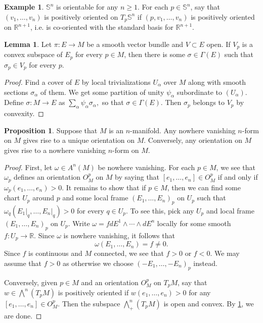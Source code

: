 \documentclass[10pt,letterpaper,cm]{nupset}
\theoremstyle{definition}
\newtheorem{exmp}[definition]{Example}
\theoremstyle{theorem}
\newtheorem{lemma}[definition]{Lemma}
\newtheorem{prop}[definition]{Proposition}
\theoremstyle{remark}
\newcommand{\R}{\mathbb R}
\renewcommand{\S}{\mathbb S}
\newcommand{\1}{\mathbf{1}}
\newcommand{\0}{\vec 0}
\begin{document}
\begin{exmp}
$\S^n$ is orientable for any $n\geq 1$. For each $p \in \S^n$, say that $(v_1, \ldots, v_n)$ is positively oriented on $T_p\S^n$ if $(p, v_1, \ldots, v_n)$ is positively oriented on $\R^{n+1}$, i.e. is co-oriented with the standard basis for $\R^{n+1}$.
\end{exmp}

\begin{lemma}\label{convex}
Let $\pi : E \to M$ be a smooth vector bundle and $V \subset E$ open. If $V_p$ is a convex subspace of $E_p$ for every $p\in M$, then there is some $\sigma \in \Gamma(E)$ such that $\sigma_p \in V_p$ for every $p$.
\end{lemma}
\begin{proof}
Find a cover of $E$ by local trivializations $U_{\alpha}$ over $M$ along with smooth sections $\sigma_{\alpha}$ of them. We get some partition of unity $\psi_{\alpha}$ subordinate to $(U_{\alpha})$. Define $\sigma: M \to E$ as $\sum_{\alpha} \psi_{\alpha}\sigma_{\alpha} ,$ so that $\sigma \in \Gamma(E)$. Then $\sigma_p$ belongs to $V_p$ by convexity.
\end{proof}

\begin{prop}
Suppose that $M$ is an $n$-manifold. Any nowhere vanishing $n$-form on $M$ gives rise to a unique orientation on $M$. Conversely, any orientation on $M$ gives rise to a nowhere vanishing $n$-form on $M$.
\end{prop}
\begin{proof}
First, let $\omega \in A^n(M)$ be nowhere vanishing. For each $p \in M$, we see that $\omega_p$ defines an orientation $O_M^p$ on $M$ by saying that $[e_1, \ldots, e_n] \in  O_M^p$ if and only if $\omega_p(e_1, \ldots, e_n) >0$. It remains to show that if $p\in M$, then we can find some chart $U_p$ around $p$ and some local frame $(E_1, \ldots, E_n)_p$ on $U_p$ such that $\omega_q(E_1\bigr\rvert_q, \ldots, E_n\bigr\rvert_q) >0$ for every $q \in U_p$. To see this, pick any $U_p$ and local frame $(E_1, \ldots, E_n)_p$ on $U_p$. Write $\omega = fdE^1 \wedge \cdots \wedge dE^n$ locally for some smooth $f: U_p \to \R$. Since $\omega$ is nowhere vanishing, it follows that $$\omega(E_1, \ldots, E_n) = f \ne 0.$$ Since $f$ is continuous and $M$ connected, we see that $f>0$ or $f<0$. We may assume that $f>0$ as otherwise we choose $(-E_1, \ldots, -E_n)_p$ instead. 

\medskip


Conversely, given $p\in M$ and an orientation $O_M^p$ on $T_pM$, say that $w \in \bigwedge^n(T_pM)$ is positively oriented if $w(e_1, \ldots, e_n) >0$ for any $[e_1, \ldots, e_n] \in O_M^p$. Then the subspace $\bigwedge^n_+(T_pM)$ is open and convex. By \cref{convex}, we are done.
\end{proof}
\end{document}

